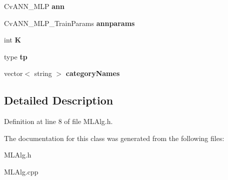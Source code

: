 \begin{DoxyCompactItemize}
\item 
\hypertarget{class_m_l_alg_adb1432782a067c9f8a1a8834d93642f5}{\-Cv\-A\-N\-N\-\_\-\-M\-L\-P {\bfseries ann}}\label{class_m_l_alg_adb1432782a067c9f8a1a8834d93642f5}

\item 
\hypertarget{class_m_l_alg_a92cf578aa93fd65a4ef521301b92839b}{\-Cv\-A\-N\-N\-\_\-\-M\-L\-P\-\_\-\-Train\-Params {\bfseries annparams}}\label{class_m_l_alg_a92cf578aa93fd65a4ef521301b92839b}

\item 
\hypertarget{class_m_l_alg_ab2be419780446f10b561fc5b2aaaeeda}{int {\bfseries \-K}}\label{class_m_l_alg_ab2be419780446f10b561fc5b2aaaeeda}

\item 
\hypertarget{class_m_l_alg_afc48fbeac702aeb6b9d32c99da80dc54}{type {\bfseries tp}}\label{class_m_l_alg_afc48fbeac702aeb6b9d32c99da80dc54}

\item 
\hypertarget{class_m_l_alg_a85ca41d5b92e86c8d9c6321adef7a5f9}{vector$<$ string $>$ {\bfseries category\-Names}}\label{class_m_l_alg_a85ca41d5b92e86c8d9c6321adef7a5f9}

\end{DoxyCompactItemize}


\subsection{\-Detailed \-Description}


\-Definition at line 8 of file \-M\-L\-Alg.\-h.



\-The documentation for this class was generated from the following files\-:\begin{DoxyCompactItemize}
\item 
\-M\-L\-Alg.\-h\item 
\-M\-L\-Alg.\-cpp\end{DoxyCompactItemize}

